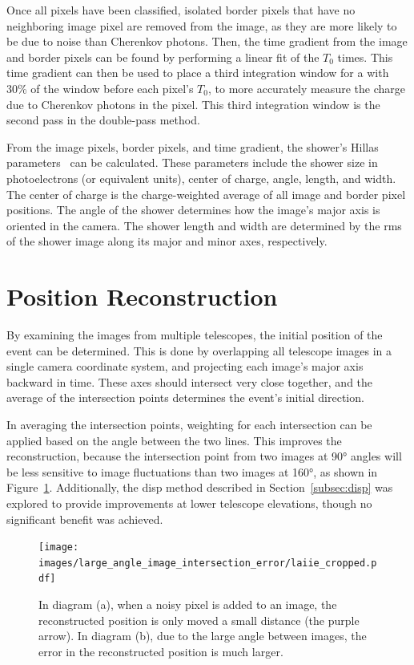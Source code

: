   Once all pixels have been classified, isolated border pixels that have no neighboring image pixel are removed from the image, as they are more likely to be due to noise than Cherenkov photons.
  Then, the time gradient from the image and border pixels can be found by performing a linear fit of the $T_{0}$ times.
  This time gradient can then be used to place a third integration window for a 
with 30\% of the window before each pixel's $T_{0}$, to more accurately measure the charge due to Cherenkov photons in the pixel.
  This third integration window is the second pass in the double-pass method.

  From the image pixels, border pixels, and time gradient, the shower's Hillas parameters~\cite{hillas_params} can be calculated.
  These parameters include the shower size in photoelectrons (or equivalent units), center of charge, angle, length, and width.
  The center of charge is the charge-weighted average of all image and border pixel positions.
  The angle of the shower determines how the image's major axis is oriented in the camera.
  The shower length and width are determined by the rms of the shower image along its major and minor axes, respectively.

\section{Position Reconstruction}\label{subsec:posrecon}
  By examining the images from multiple telescopes, the initial position of the event can be determined.
  This is done by overlapping all telescope images in a single camera coordinate system, and projecting each image's major axis backward in time.
  These axes should intersect very close together, and the average of the intersection points determines the event's initial direction.

  In averaging the intersection points, weighting for each intersection can be applied based on the angle between the two lines.
  This improves the reconstruction, because the intersection point from two images at \ang{90} angles will be less sensitive to image fluctuations than two images at \ang{160}, as shown in Figure~\ref{fig:largeintersectangle}.
  Additionally, the disp method described in Section~\ref{subsec:disp} was explored to provide improvements at lower telescope elevations, though no significant benefit was achieved.

  \begin{figure}[ht]
    \centering
    \texttt{[image: images/large\_angle\_image\_intersection\_error/laiie\_cropped.pdf]}
    \caption[Large Image Intersection Angles]{
      In diagram (a), when a noisy pixel is added to an image, the reconstructed position is only moved a small distance (the purple arrow).
      In diagram (b), due to the large angle between images, the error in the reconstructed position is much larger.
    }
    \label{fig:largeintersectangle}
  \end{figure}
  \FloatBarrier

